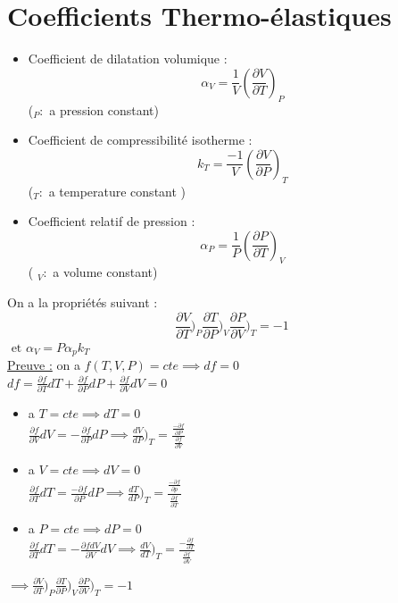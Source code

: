 \documentclass[12pt,oneside]{book}
\begin{document}
\section{Coefficients Thermo-élastiques}
\begin{itemize}
    \item Coefficient de dilatation volumique : \\
          \[\alpha_V =\frac{1}{V}(\frac{\partial V}{\partial T})_P\]
          ($_P : $ a pression constant)
    \item Coefficient de compressibilité isotherme :\\
          \[k_T = \frac{-1}{V}(\frac{\partial V}{\partial P})_T\]
          ($_T :$ a temperature constant )
    \item Coefficient relatif de pression :\\
          \[\alpha_P=\frac{1}{P}(\frac{\partial P}{\partial T})_V\]
          ( $_V : $ a volume constant)
\end{itemize}
On a la propriétés suivant :
\[\boxed{\frac{\partial V}{\partial T})_P \frac{\partial T}{\partial P})_V\frac{\partial P}{\partial V})_T = -1 }\]
$\text{ et } \alpha_V = P\alpha_pk_T $\\
\underline{Preuve :}
on a $f(T,V,P) = cte \implies df = 0$ \\
$df = \frac{\partial f}{\partial T}dT + \frac{\partial f}{\partial P}dP + \frac{\partial f}{\partial V}dV = 0$ \\
\begin{itemize}
    \item a $T = cte \implies dT = 0$\\
          $\frac{\partial f}{\partial V}dV = -\frac{\partial f}{\partial P}dP \implies \frac{dV}{dP})_T = \frac{\frac{-\partial f}{\partial P}}{\frac{\partial f}{\partial V}}$
    \item a $V =cte \implies dV =0$\\
          $\frac{\partial f}{\partial T} dT = \frac{-\partial f}{\partial P}dP \implies \frac{dT}{dP})_T = \frac{\frac{-\partial f}{\partial p}}{\frac{\partial f}{\partial T}} $
    \item a $P = cte \implies dP = 0$\\
          $\frac{\partial f}{\partial T}dT = -\frac{\partial f dV}{\partial V}dV \implies \frac{dV}{dT})_T = \frac{-\frac{\partial f}{\partial T}}{\frac{\partial f}{\partial V}}$
\end{itemize}
$\implies \frac{\partial V}{\partial T})_P \frac{\partial T}{\partial P})_V\frac{\partial P}{\partial V})_T = -1$
\end{document}
